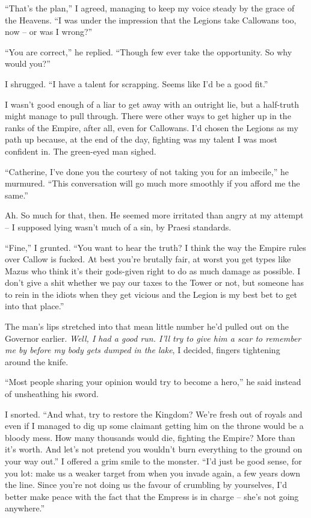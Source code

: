 \documentclass[12pt, openany]{book}
\begin{document}
“That’s the plan,” I agreed, managing to keep my voice steady by the grace of the Heavens. “I was under the impression that the Legions take Callowans too, now – or was I wrong?”

“You are correct,” he replied. “Though few ever take the opportunity. So why would you?”

I shrugged. “I have a talent for scrapping. Seems like I’d be a good fit.”

I wasn’t good enough of a liar to get away with an outright lie, but a half-truth might manage to pull through. There were other ways to get higher up in the ranks of the Empire, after all, even for Callowans. I’d chosen the Legions as my path up because, at the end of the day, fighting was my talent I was most confident in. The green-eyed man sighed.

“Catherine, I’ve done you the courtesy of not taking you for an imbecile,” he murmured. “This conversation will go much more smoothly if you afford me the same.”

Ah. So much for that, then. He seemed more irritated than angry at my attempt – I supposed lying wasn’t much of a sin, by Praesi standards.

“Fine,” I grunted. “You want to hear the truth? I think the way the Empire rules over Callow is fucked. At best you’re brutally fair, at worst you get types like Mazus who think it’s their gods-given right to do as much damage as possible. I don’t give a shit whether we pay our taxes to the Tower or not, but someone has to rein in the idiots when they get vicious and the Legion is my best bet to get into that place.”

The man’s lips stretched into that mean little number he’d pulled out on the Governor earlier. \textit{Well, I had a good run. I’ll try to give him a scar to remember me by before my body gets dumped in the lake}, I decided, fingers tightening around the knife.

“Most people sharing your opinion would try to become a hero,” he said instead of unsheathing his sword.

I snorted. “And what, try to restore the Kingdom? We’re fresh out of royals and even if I managed to dig up some claimant getting him on the throne would be a bloody mess. How many thousands would die, fighting the Empire? More than it’s worth. And let’s not pretend you wouldn’t burn everything to the ground on your way out.” I offered a grim smile to the monster. “I’d just be good sense, for you lot: make us a weaker target from when you invade again, a few years down the line. Since you’re not doing us the favour of crumbling by yourselves, I’d better make peace with the fact that the Empress is in charge – she’s not going anywhere.”
\end{document}
